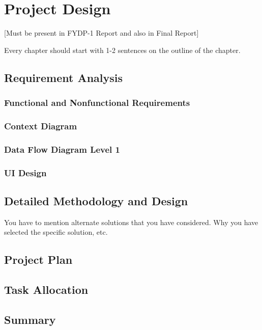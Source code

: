 \chapter{Project Design}

[Must be present in FYDP-1 Report and also in Final Report]

Every chapter should start with 1-2 sentences on the outline of the chapter.

\section{Requirement Analysis}
\subsection{Functional and Nonfunctional Requirements}
\subsection{Context Diagram}
\subsection{Data Flow Diagram Level 1}
\subsection{UI Design}
\section{Detailed Methodology and Design}
You have to mention alternate solutions that you have considered. Why you have selected the specific solution, etc.
\section{Project Plan}
\section{Task Allocation}

\section{Summary}
